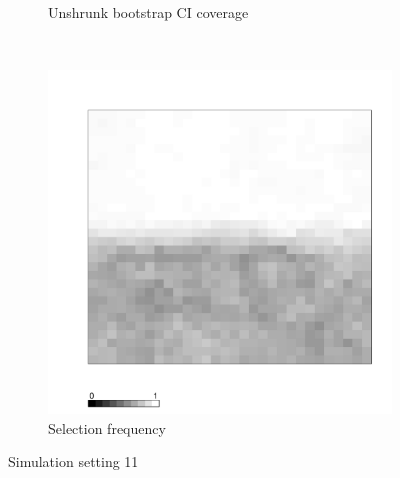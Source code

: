 \documentclass[authoryear, review, 11pt]{elsarticle}
\begin{document}
\begin{figure}
\begin{subfigure}[b]{0.45\textwidth}
		\caption{Unshrunk bootstrap CI coverage}
	\end{subfigure}%
	~ %
	\begin{subfigure}[b]{0.45\textwidth}
	\centering
		\includegraphics[width=\textwidth]{../../figures/simulation/X1.15.11.selection.pdf}
		\caption{Selection frequency}
	\end{subfigure}
	\caption{Simulation setting 11}
\end{figure}

\clearpage
\end{document}
